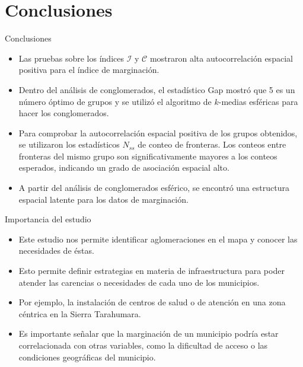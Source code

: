 \documentclass{beamer}
\begin{document}
\section{Conclusiones}
\begin{frame}{Conclusiones}
  \begin{itemize}
    \item Las pruebas sobre los índices $\mathcal{I}$ y $\mathcal{C}$ mostraron alta autocorrelación espacial positiva para el índice de marginación.

    \item Dentro del análisis de conglomerados, el estadístico Gap mostró que 5 es un número óptimo de grupos y se utilizó el algoritmo de $k$-medias esféricas para hacer los conglomerados. 

    \item Para comprobar la autocorrelación espacial positiva de los grupos obtenidos, se utilizaron los estadísticos $N_{ss}$ de conteo de fronteras. Los conteos entre fronteras del mismo grupo son significativamente mayores a los conteos esperados, indicando un grado de asociación espacial alto.

    \item A partir del análisis de conglomerados esférico, se encontró una estructura espacial latente para los datos de marginación.
  \end{itemize}
\end{frame}


\begin{frame}{Importancia del estudio}
  \begin{itemize}
    \item Este estudio nos permite identificar aglomeraciones en el mapa y conocer las necesidades de éstas. 
    \item Esto permite definir estrategias en materia de infraestructura para poder atender las carencias o necesidades de cada uno de los municipios. 
    \item Por ejemplo, la instalación de centros de salud o de atención en una zona céntrica en la Sierra Tarahumara. 

    \item Es importante señalar que la marginación de un municipio podría estar correlacionada con otras variables, como la dificultad de acceso o las condiciones geográficas del municipio.
  \end{itemize}
\end{frame}
\end{document}
